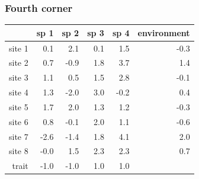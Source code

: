 \documentclass{beamer}
\numberwithin{exercise}{section}
\begin{document}
\begin{frame}
\frametitle{Fourth corner}
\small
\begin{table}[ht]
\begin{center}
\begin{tabular}{r|rrrr|r|}
  & sp 1 & sp 2 & sp 3 & sp 4 & environment \\ 
  \hline
site 1 & 0.1 & 2.1 & 0.1 & 1.5 & -0.3 \\ 
  site 2 & 0.7 & -0.9 & 1.8 & 3.7 & 1.4 \\ 
  site 3 & 1.1 & 0.5 & 1.5 & 2.8 & -0.1 \\ 
  site 4 & 1.3 & -2.0 & 3.0 & -0.2 & 0.4 \\ 
  site 5 & 1.7 & 2.0 & 1.3 & 1.2 & -0.3 \\ 
  site 6 & 0.8 & -0.1 & 2.0 & 1.1 & -0.6 \\ 
  site 7 & -2.6 & -1.4 & 1.8 & 4.1 & 2.0 \\ 
  site 8 & -0.0 & 1.5 & 2.3 & 2.3 & 0.7 \\ 
   \hline
  trait & -1.0 & -1.0 & 1.0 & 1.0 &  \\ 
   \hline
\end{tabular}
\end{center}
\end{table}\normalsize 
\end{frame}
\end{document}
